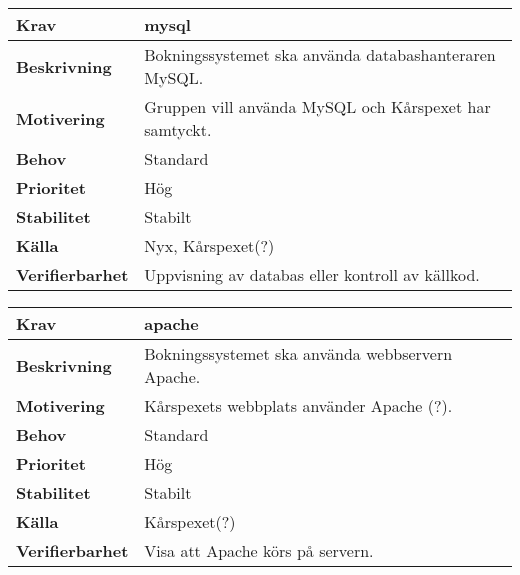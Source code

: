 \documentclass[a4paper, twoside, 11pt, titlepage]{article}
\begin{document}
		\begin{tabular} { p{2.6cm} p{12.5cm} }
			\hline
			\sffamily\textbf{Krav} & mysql  \\
			\hline
			\sffamily\textbf{Beskrivning} & Bokningssystemet ska använda databashanteraren MySQL.  \\
			\hline
			\sffamily\textbf{Motivering} & Gruppen vill använda MySQL och Kårspexet har samtyckt.  \\
			\hline
			\sffamily\textbf{Behov} & Standard  \\
			\hline
			\sffamily\textbf{Prioritet} & Hög  \\
			\hline
			\sffamily\textbf{Stabilitet} & Stabilt  \\
			\hline
			\sffamily\textbf{Källa} & Nyx, Kårspexet(?)  \\
			\hline
			\sffamily\textbf{Verifierbarhet} & Uppvisning av databas eller kontroll av källkod.  \\
			\hline
		\end{tabular}
		\vspace{6mm}

		\begin{tabular} { p{2.6cm} p{12.5cm} }
			\hline
			\sffamily\textbf{Krav} & apache  \\
			\hline
			\sffamily\textbf{Beskrivning} & Bokningssystemet ska använda webbservern Apache.  \\
			\hline
			\sffamily\textbf{Motivering} & Kårspexets webbplats använder Apache (?).  \\
			\hline
			\sffamily\textbf{Behov} & Standard  \\
			\hline
			\sffamily\textbf{Prioritet} & Hög  \\
			\hline
			\sffamily\textbf{Stabilitet} & Stabilt  \\
			\hline
			\sffamily\textbf{Källa} & Kårspexet(?)  \\
			\hline
			\sffamily\textbf{Verifierbarhet} & Visa att Apache körs på servern.  \\
			\hline
		\end{tabular}
		\vspace{6mm}
\end{document}
